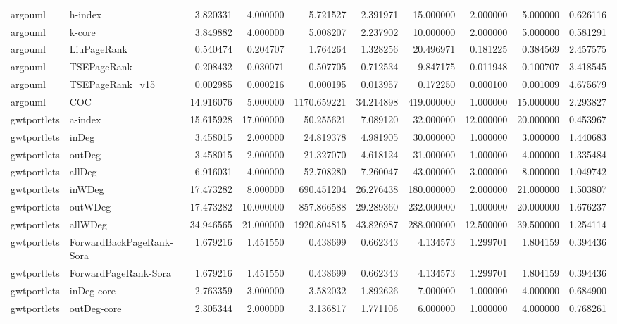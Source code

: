 \begin{tabular}{llrrrrrrrr}
argouml & h-index & 3.820331 & 4.000000 & 5.721527 & 2.391971 & 15.000000 & 2.000000 & 5.000000 & 0.626116 \\
argouml & k-core & 3.849882 & 4.000000 & 5.008207 & 2.237902 & 10.000000 & 2.000000 & 5.000000 & 0.581291 \\
argouml & LiuPageRank & 0.540474 & 0.204707 & 1.764264 & 1.328256 & 20.496971 & 0.181225 & 0.384569 & 2.457575 \\
argouml & TSEPageRank & 0.208432 & 0.030071 & 0.507705 & 0.712534 & 9.847175 & 0.011948 & 0.100707 & 3.418545 \\
argouml & TSEPageRank_v15 & 0.002985 & 0.000216 & 0.000195 & 0.013957 & 0.172250 & 0.000100 & 0.001009 & 4.675679 \\
argouml & COC & 14.916076 & 5.000000 & 1170.659221 & 34.214898 & 419.000000 & 1.000000 & 15.000000 & 2.293827 \\
gwtportlets & a-index & 15.615928 & 17.000000 & 50.255621 & 7.089120 & 32.000000 & 12.000000 & 20.000000 & 0.453967 \\
gwtportlets & inDeg & 3.458015 & 2.000000 & 24.819378 & 4.981905 & 30.000000 & 1.000000 & 3.000000 & 1.440683 \\
gwtportlets & outDeg & 3.458015 & 2.000000 & 21.327070 & 4.618124 & 31.000000 & 1.000000 & 4.000000 & 1.335484 \\
gwtportlets & allDeg & 6.916031 & 4.000000 & 52.708280 & 7.260047 & 43.000000 & 3.000000 & 8.000000 & 1.049742 \\
gwtportlets & inWDeg & 17.473282 & 8.000000 & 690.451204 & 26.276438 & 180.000000 & 2.000000 & 21.000000 & 1.503807 \\
gwtportlets & outWDeg & 17.473282 & 10.000000 & 857.866588 & 29.289360 & 232.000000 & 1.000000 & 20.000000 & 1.676237 \\
gwtportlets & allWDeg & 34.946565 & 21.000000 & 1920.804815 & 43.826987 & 288.000000 & 12.500000 & 39.500000 & 1.254114 \\
gwtportlets & ForwardBackPageRank-Sora & 1.679216 & 1.451550 & 0.438699 & 0.662343 & 4.134573 & 1.299701 & 1.804159 & 0.394436 \\
gwtportlets & ForwardPageRank-Sora & 1.679216 & 1.451550 & 0.438699 & 0.662343 & 4.134573 & 1.299701 & 1.804159 & 0.394436 \\
gwtportlets & inDeg-core & 2.763359 & 3.000000 & 3.582032 & 1.892626 & 7.000000 & 1.000000 & 4.000000 & 0.684900 \\
gwtportlets & outDeg-core & 2.305344 & 2.000000 & 3.136817 & 1.771106 & 6.000000 & 1.000000 & 4.000000 & 0.768261 \\

\end{tabular}
